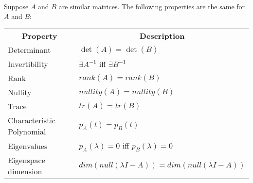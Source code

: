 \documentclass{report}
\begin{document}
		\begin{thm}
			Suppose $A$ and $B$ are similar matrices. The following properties are the same for $A$ and $B$: \\
			\begin{tabular}{ll}
				\multicolumn{1}{c}{\textbf{Property}} & \multicolumn{1}{c}{\textbf{Description}}             \\
				Determinant                           & $\det(A)=\det(B)$                                    \\
				Invertibility                         & $\exists A^{-1}$ iff $\exists B^{-1}$                \\
				Rank                                  & $rank(A)=rank(B)$                                    \\
				Nullity                               & $nullity(A)=nullity(B)$                              \\
				Trace                                 & $tr(A)=tr(B)$                                        \\
				Characteristic Polynomial             & $p_A(t)=p_B(t)$                                      \\
				Eigenvalues                           & $p_A(\lambda)=0$ iff $p_B(\lambda)=0$                \\
				Eigenspace dimension                  & $dim(null(\lambda I-A))=dim(null(\lambda I-A))$
			\end{tabular}
		\end{thm}
		
		
\begin{comment}
		\subsection{Hermitian, Unitary, and Normal Matrices}
		If we talked about special real matrices, this section is on special complex matrices. Comparing with real matrices, Hermitian is similar to symmetric, Unitary is similar to Orthogonal.
		
		\begin{defn}[Conjugate Transpose of a Matrix]
			If $A$ is a complex matrix, then the \emph{conjugate transpose} of $A$, denoted by $A^*$, is defined by $A^*=\bar{A}^T$, where $\bar{A}$ indicates elementwise conjugation of the matrix.
		\end{defn}
		
		\begin{thm}
			If $k$ is a complex scalar and if $A, B, C$ are complex matrices whose sizes are such that the stated operations can be performed, then:
			\begin{enumerate}
				\item $(A^*)^*=A$
				\item $(A+B)^*=A^*+B^*$
				\item $(A-B)^*=A^*-B^*$
				\item $(kA)^*=\bar{k}A^*$
				\item $(AB)^*=B^*A^*$
			\end{enumerate}
		\end{thm}
\end{comment}
	
\end{document}
